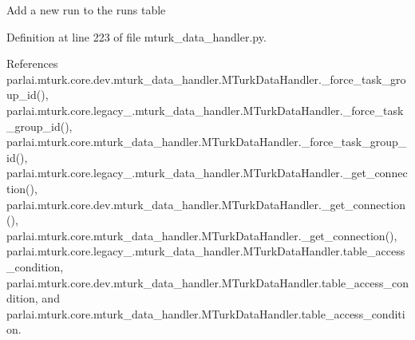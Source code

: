 \begin{DoxyVerb}Add a new run to the runs table\end{DoxyVerb}
 

Definition at line 223 of file mturk\+\_\+data\+\_\+handler.\+py.



References parlai.\+mturk.\+core.\+dev.\+mturk\+\_\+data\+\_\+handler.\+M\+Turk\+Data\+Handler.\+\_\+force\+\_\+task\+\_\+group\+\_\+id(), parlai.\+mturk.\+core.\+legacy\+\_.\+mturk\+\_\+data\+\_\+handler.\+M\+Turk\+Data\+Handler.\+\_\+force\+\_\+task\+\_\+group\+\_\+id(), parlai.\+mturk.\+core.\+mturk\+\_\+data\+\_\+handler.\+M\+Turk\+Data\+Handler.\+\_\+force\+\_\+task\+\_\+group\+\_\+id(), parlai.\+mturk.\+core.\+legacy\+\_.\+mturk\+\_\+data\+\_\+handler.\+M\+Turk\+Data\+Handler.\+\_\+get\+\_\+connection(), parlai.\+mturk.\+core.\+dev.\+mturk\+\_\+data\+\_\+handler.\+M\+Turk\+Data\+Handler.\+\_\+get\+\_\+connection(), parlai.\+mturk.\+core.\+mturk\+\_\+data\+\_\+handler.\+M\+Turk\+Data\+Handler.\+\_\+get\+\_\+connection(), parlai.\+mturk.\+core.\+legacy\+\_.\+mturk\+\_\+data\+\_\+handler.\+M\+Turk\+Data\+Handler.\+table\+\_\+access\+\_\+condition, parlai.\+mturk.\+core.\+dev.\+mturk\+\_\+data\+\_\+handler.\+M\+Turk\+Data\+Handler.\+table\+\_\+access\+\_\+condition, and parlai.\+mturk.\+core.\+mturk\+\_\+data\+\_\+handler.\+M\+Turk\+Data\+Handler.\+table\+\_\+access\+\_\+condition.


